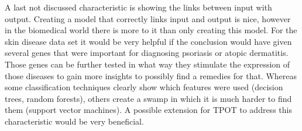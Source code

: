 \documentclass[10pt,a4paper]{article}
\begin{document}
	A last not discussed characteristic is showing the links between input with output. Creating a model that correctly links input and output is nice, however in the biomedical world there is more to it than only creating this model. For the skin disease data set it would be very helpful if the conclusion would have given several genes that were important for diagnosing psoriasis or atopic dermatitis. Those genes can be further tested in what way they stimulate the expression of those diseases to gain more insights to possibly find a remedies for that. Whereas some classification techniques clearly show which features were used (decision trees, random forests), others create a swamp in which it is much harder to find them (support vector machines). A possible extension for TPOT to address this characteristic would be very beneficial.
	
	 
	
	
\end{document}
